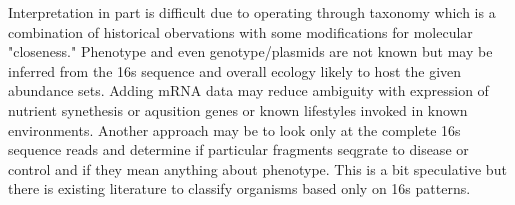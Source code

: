 \documentclass[aps,secnumarabic,balancelastpage,amsmath,amssymb,nofootinbib]{revtex4}
\begin{document}
Interpretation in part is difficult due to operating through
taxonomy which is a combination of historical obervations 
with some modifications for molecular "closeness."  Phenotype
and even genotype/plasmids  are not known but may be inferred from the
16s sequence and overall ecology likely to host the given
abundance sets. Adding mRNA data  may reduce ambiguity with
expression of nutrient synethesis or aqusition genes or known
lifestyles invoked in known environments. Another approach
may be to look only at the complete 16s sequence reads and
determine if particular fragments seqgrate to disease or
control and if they mean anything about phenotype. 
This is a bit speculative but there is existing literature to
classify organisms based only on 16s patterns.  


\begin{comment}
In previous work, I had motivated the idea that many
afflictions of old age are the result of nutrient deficiencies largely
due to GI problems which are often ignored. Much of this argument
was made in a response to \mjmdisease which continues to
be most severe in the elderly and recently described
as specifically the frail elderly or those most resembling
the picture of classic starvation.
Alzheimer's disease remains as an outstanding age-correlated disease.
While some drug approvals have been predicated on amyloid beta
removal, current trial performance is limited and real-world
experience unclear. A recent work describing the microbiome of
postmortem brain samples distinguished by AD status highlighted
organisms with known relationships to ambient tryptophan, tyrosine or
metabolites such as serotonin or benzene derivatives. 

The ability to do "clean" experiments on biological entities
is largely an illustion. However, even ambiguous data have value
if they are analyzed that way. Correlations may be useful but
any intervention is predicated on some caisality even
if that is never entirely elucidated or even stated.
And of course they fail due to only an imaginary re3ationship.

Microbiomes would unlikely be considered  clean or simple
experiments but given enough organism abundances, and knowledge
of organism lifestyle, some inferences may be made about importat
states or ecology that may not be obvious a priori or compelling
enough to do tests for specific metabolites. Genotypes as
reflected in 16s rRNA and perhaps phenotypes as reflected in 
mRNA sequencing may be good open ended tests but yield in
essence "transform data" similar to say fourier or other techniques.

Some recent work on miRNA pointed to a causal role for MEG3
in neuron loss in AD patients prompting the addition of another
target to attack. However, there is some indication even this
may reflect Trp limitations. 
  

\end{comment}
\end{document}
